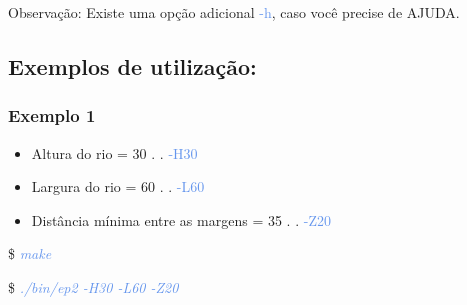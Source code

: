\documentclass[a4paper,12pt]{article}
\begin{document}
  Observação: Existe uma opção adicional \textcolor{CornflowerBlue}{-h}, caso você precise de AJUDA.
  
  \newpage %
  \subsection{\textcolor{NavyBlue}{Exemplos de utilização:}}
  \bigskip
  
    \subsubsection{\textcolor{NavyBlue}{Exemplo 1}}
    \bigskip
    \begin{itemize}
  
    \item Altura do rio = 30  . . \textcolor{CornflowerBlue}{-H30}
    \item Largura do rio = 60  . . \textcolor{CornflowerBlue}{-L60}  
    \item Distância mínima entre as margens = 35  . . \textcolor{CornflowerBlue}{-Z20}
    
    \end{itemize}  
    \bigskip
    
    \$ \textcolor{CornflowerBlue}{\textit{make}}
    
    \$ \textcolor{CornflowerBlue}{\textit{./bin/ep2 -H30 -L60 -Z20}}
  
\end{document}
